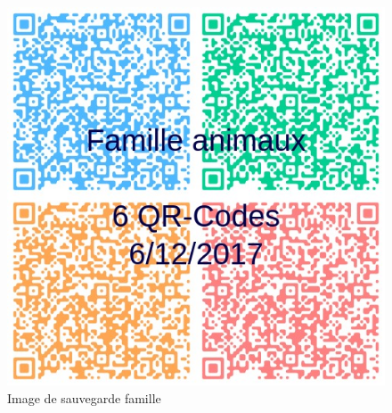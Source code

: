 \begin{figure}[]
	\centering
   \includegraphics[scale=0.2]{img/animaux.jpeg}
   \caption{Image de sauvegarde famille}
\end{figure}